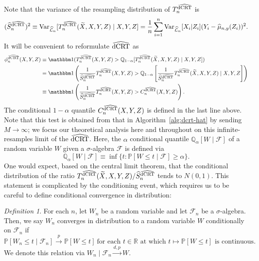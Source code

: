 \documentclass[aos]{imsart}
\theoremstyle{plain}
\theoremstyle{remark}
\newtheorem{definition}{Definition}
\newcommand{\V}{\mathrm{Var}}							%
\renewcommand{\P}{\mathbb{P}}							%
\newcommand{\Q}{\mathbb{Q}}								%
\newcommand{\R}{\mathbb{R}}								%
\newcommand{\indicator}{\mathbbm 1}						%
\newcommand{\convp}{\overset p \rightarrow}             %
\newcommand{\srx}{X}									%
\newcommand{\srz}{Z}									%
\newcommand{\srxk}{\widetilde X}						%
\newcommand{\sry}{Y}									%
\newcommand{\lawhat}{\widehat{\mathcal L}}				%
\newcommand{\dCRThat}{\widehat{\textnormal{dCRT}}}		%
\newcommand{\convdp}{\overset {d,p} \longrightarrow}    %
\begin{document}
Note that the variance of the resampling distribution of $T_n^{\dCRThat}$ is
\begin{equation}
	\small
    (\widehat S_{n}^{\dCRThat})^2 \equiv \V_{\lawhat_n}[T_n^{\dCRThat}(\srxk, \srx, \sry, \srz) \mid \srx, \sry, \srz] = \frac{1}{n}\sum_{i = 1}^n \V_{\lawhat_n}[\srx_i|\srz_i](\sry_i - \widehat \mu_{n,y}(\srz_i))^2.
    \label{eq:conditional-variance-def}
\end{equation}
It will be convenient to reformulate $\dCRThat$ as 
\begin{equation*}
    \begin{split}
        \phi^{\dCRThat}_n(\srx, \sry, \srz) &\equiv \indicator(T_n^{\dCRThat}(\srx, \sry, \srz) > \Q_{1-\alpha}[T_n^{\dCRThat}(\srxk, \srx, \sry, \srz) \mid \srx, \sry, \srz]) \\
        &= \indicator\left(\frac{1}{\widehat S_{n}^{\dCRThat}}T_n^{\dCRThat}(\srx, \sry, \srz) > \Q_{1-\alpha}\left[\frac{1}{\widehat S_{n}^{\dCRThat}}T_n^{\dCRThat}(\srxk, \srx, \sry, \srz) \mid \srx, \sry, \srz\right]\right) \\
        &\equiv \indicator\left(\frac{1}{\widehat S_{n}^{\dCRThat}}T_n^{\dCRThat}(\srx, \sry, \srz) > C^{\dCRThat}_n(\srx, \sry, \srz)\right).
    \end{split}
\end{equation*}
The conditional $1-\alpha$ quantile $C^{\dCRThat}_n(\srx, \sry, \srz)$ is defined in the last line above. Note that this test is obtained from that in Algorithm~\ref{alg:dcrt-hat} by sending $M \rightarrow \infty$; we focus our theoretical analysis here and throughout on this infinite-resamples limit of the $\dCRThat$. Here, the $\alpha$ conditional quantile $\Q_{\alpha}[W \mid \mathcal F]$ of a random variable $W$ given a $\sigma$-algebra $\mathcal F$ is defined via
\begin{equation}
    \mathbb{Q}_{\alpha}[W \mid \mathcal F] \equiv \inf\{t:\P[W \leq t \mid \mathcal F] \geq \alpha\}.
\end{equation}
One would expect, based on the central limit theorem, that the conditional distribution of the ratio $T_n^{\dCRThat}(\srxk, \srx, \sry, \srz)/\widehat S_{n}^{\dCRThat}$ tends to $N(0,1)$. This statement is complicated by the conditioning event, which requires us to be careful to define conditional convergence in distribution:

\begin{definition} \label{def:conditional-convergence-distribution}
    For each $n$, let $W_n$ be a random variable and let $\mathcal F_n$ be a $\sigma$-algebra. Then, we say $W_n$ converges in distribution to a random variable $W$ conditionally on $\mathcal F_n$ if
    \begin{equation}
        \P[W_n \leq t \mid \mathcal F_n] \convp \P[W \leq t] \ \text{for each } t \in \R \text{ at which } t \mapsto \P[W \leq t] \text{ is continuous.}
    \end{equation}
    We denote this relation via $W_n \mid \mathcal F_n \convdp W$.
\end{definition}
\end{document}

